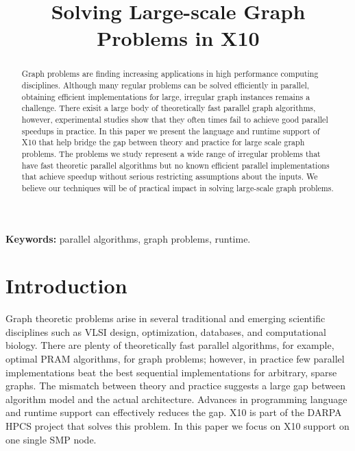 \documentclass{llncs}
\begin{document}

\title{Solving Large-scale Graph Problems in X10}
\titlerunning{}
\author{ }
\institute{}
\maketitle

\begin{abstract}
  Graph problems are finding increasing applications in high
performance computing disciplines. Although many regular problems 
can be solved efficiently in parallel, obtaining efficient
  implementations for large, irregular graph instances remains a challenge.
 There exisit a large body of theoretically fast parallel graph algorithms, however, 
 experimental studies show that they often times fail to achieve good parallel speedups 
 in practice. 
 In this paper we present the language and runtime support of X10 that help 
 bridge the gap between theory and practice for large scale graph problems. 
 The problems we study represent a wide range of irregular problems that have fast
  theoretic parallel algorithms but no known efficient
  parallel implementations that achieve speedup without serious restricting assumptions about the inputs.
We believe our techniques will be of  practical impact in solving large-scale graph problems.
\end{abstract}

\noindent
\textbf{Keywords:}
 parallel algorithms, graph problems, runtime.

\section{Introduction}
\label{s:intr}
 Graph theoretic problems arise in several traditional and emerging scientific disciplines such as VLSI design, optimization, databases, and computational biology. There are plenty of theoretically fast parallel algorithms, for example, optimal PRAM algorithms, for graph problems; however, in
 practice few parallel implementations beat the best sequential implementations for arbitrary, sparse
 graphs. The mismatch between theory and practice suggests a large gap between algorithm model and the actual architecture. Advances in programming language and runtime support can effectively reduces the gap.
 X10 is part of the DARPA HPCS project that solves this problem.  In this paper we focus on X10 support on one single SMP node.
 
\end{document}
